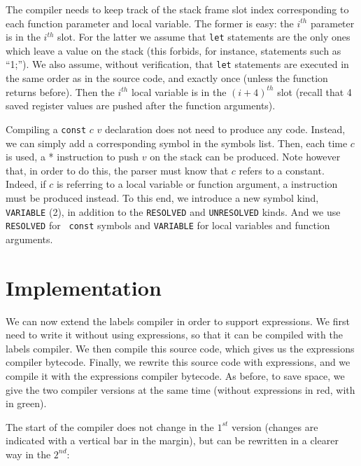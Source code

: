 The compiler needs to keep track of the stack frame slot index corresponding to
each function parameter and local variable. The former is easy: the $i^{th}$
parameter is in the $i^{th}$ slot. For the latter we assume that {\tt let}
statements are the only ones which leave a value on the stack (this forbids,
for instance, statements such as ``1;''). We also assume, without verification,
that {\tt let} statements are executed in the same order as in the source code,
and exactly once (unless the function returns before). Then the $i^{th}$ local
variable is in the $(i+4)^{th}$ slot (recall that 4 saved register values are
pushed after the function arguments).

Compiling a {\tt const} $c$ $v$ declaration does not need to produce any code.
Instead, we can simply add a corresponding symbol in the symbols list. Then,
each time $c$ is used, a * instruction to push $v$ on the stack can
be produced. Note however that, in order to do this, the parser must know that
$c$ refers to a constant. Indeed, if $c$ is referring to a local variable or
function argument, a  instruction must be produced instead. To this
end, we introduce a new symbol kind, {\tt VARIABLE} (2), in addition to the
{\tt RESOLVED} and {\tt UNRESOLVED} kinds. And we use {\tt RESOLVED} for {\tt
const} symbols and {\tt VARIABLE} for local variables and function arguments.

\section{Implementation}


We can now extend the labels compiler in order to support expressions. We first
need to write it without using expressions, so that it can be compiled with the
labels compiler. We then compile this source code, which gives us the
expressions compiler bytecode. Finally, we rewrite this source code with
expressions, and we compile it with the expressions compiler bytecode. As
before, to save space, we give the two compiler versions at the same time
(without expressions in red, with in green).

The start of the compiler does not change in the $1^{st}$ version (changes are
indicated with a vertical bar in the margin), but can be rewritten in a clearer
way in the $2^{nd}$:


